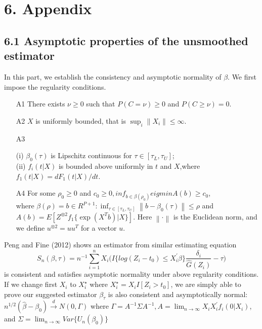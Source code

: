 \documentclass[12pt]{article}
\begin{document}
\section{6. Appendix}
\subsection{6.1 Asymptotic properties of the unsmoothed estimator}
	\noindent In this part, we establish the consistency and asymptotic normality of $\beta$. We first impose the regularity conditions.
	
	\begin{enumerate}
		\item[A1] There exists $\nu \ge 0$ such that $P(C = \nu) \ge 0$ and $P(C \ge \nu) =0$.
		\item[A2] $X$ is uniformly bounded, that is $\sup_i \left\lVert X_i \right\rVert \le \infty$. 
		\item[A3] 
		\begin{flushleft}
			(i) $\beta_0(\tau)$ is Lipschitz continuous for $\tau \in [\tau_L, \tau_U]$;\\
			(ii) $f_i(t|X)$ is bounded above uniformly in $t$ and $X$,where $f_1(t|X) = dF_1(t|X)/dt$.
		\end{flushleft}
		\item[A4] For some $\rho_0 \ge 0$ and $c_0 \ge 0, inf_{b \in \beta(\rho_0)} eigmin A(b) \geq c_0$,\\ where $\beta(\rho)={b\in R^{P+1} : \inf_{\tau \in [\tau_L, \tau_U]}
			\left\lVert b-\beta_0(\tau) \right\rVert \leq \rho}$ and $A(b) = E[Z^{\otimes2}f_1 \{\exp(X^T b)|X\}]$. Here $\left\lVert \cdot \right\rVert$ is the Euclidean norm, and we define $u^{\otimes2} = uu^T$ for a vector $u$.
	\end{enumerate}
	
	\noindent Peng and Fine (2012) shows an estimator from similar estimating equation
	\begin{equation} \label{eq:6}
	S_n(\beta, \tau)=n^{-1}\sum_{i=1}^{n}X_i \Big( I\{log(Z_i-t_0) \leq X_i^{\prime} \beta\} \frac{\delta_i}{\hat{G}(Z_i)}  -\tau \Big)
	\end{equation}
	\noindent is consistent and satisfies asymptotic normality under above regularity conditions. If we change first $X_i$ to $X_i^\star$ where $X_i^\star = X_i I[Z_i>t_0]$, we are simply able to prove our suggested estimator $\beta_\tau$ is also consistent and asymptotically normal:
	\begin{math}
	n^{1/2}(\hat{\beta}-\beta_0) \xrightarrow{d} N(0, \Gamma)
	\end{math}
	\noindent where $\Gamma = A^{-1} \Sigma A^{-1}, A = \lim_{n \rightarrow \infty} X_i X_i^{\prime}f_i(0|X_i)$, and $\Sigma = \lim_{n \rightarrow \infty} Var\{U_n(\beta_0)\}$
	
\end{document}
